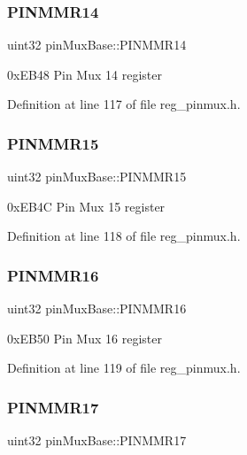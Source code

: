 \subsubsection{\texorpdfstring{P\+I\+N\+M\+M\+R14}{PINMMR14}}
{\footnotesize\ttfamily uint32 pin\+Mux\+Base\+::\+P\+I\+N\+M\+M\+R14}

0x\+E\+B48 Pin Mux 14 register 

Definition at line 117 of file reg\+\_\+pinmux.\+h.

\mbox{\label{structpinMuxBase_a844995058a33113108381274896f38bd}} 
\subsubsection{\texorpdfstring{P\+I\+N\+M\+M\+R15}{PINMMR15}}
{\footnotesize\ttfamily uint32 pin\+Mux\+Base\+::\+P\+I\+N\+M\+M\+R15}

0x\+E\+B4C Pin Mux 15 register 

Definition at line 118 of file reg\+\_\+pinmux.\+h.

\mbox{\label{structpinMuxBase_a07d386780af2553e895d416b14be9087}} 
\subsubsection{\texorpdfstring{P\+I\+N\+M\+M\+R16}{PINMMR16}}
{\footnotesize\ttfamily uint32 pin\+Mux\+Base\+::\+P\+I\+N\+M\+M\+R16}

0x\+E\+B50 Pin Mux 16 register 

Definition at line 119 of file reg\+\_\+pinmux.\+h.

\mbox{\label{structpinMuxBase_a91bd5a46bde72edc284e273993403e03}} 
\subsubsection{\texorpdfstring{P\+I\+N\+M\+M\+R17}{PINMMR17}}
{\footnotesize\ttfamily uint32 pin\+Mux\+Base\+::\+P\+I\+N\+M\+M\+R17}

